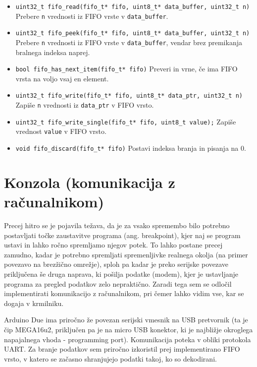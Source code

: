 \documentclass[12pt,a4paper,twoside,openright,slovene]{book}
\begin{document}
\begin{itemize}
	\item[] \lstinline{uint32_t fifo_read(fifo_t* fifo, uint8_t* data_buffer, uint32_t n)}\newline
		Prebere \lstinline{n} vrednosti iz FIFO vrste v \lstinline{data_buffer}.
	\item[] \lstinline{uint32_t fifo_peek(fifo_t* fifo, uint8_t* data_buffer, uint32_t n)}\newline
		Prebere \lstinline{n} vrednosti iz FIFO vrste v \lstinline{data_buffer}, vendar brez premikanja bralnega indeksa naprej.
	\item[] \lstinline{bool fifo_has_next_item(fifo_t* fifo)}\newline
		Preveri in vrne, če ima FIFO vrsta na voljo vsaj en element.
	\item[] \lstinline{uint32_t fifo_write(fifo_t* fifo, uint8_t* data_ptr, uint32_t n)}\newline
		Zapiše \lstinline{n} vrednosti iz \lstinline{data_ptr} v FIFO vrsto.
	\item[] \lstinline{uint32_t fifo_write_single(fifo_t* fifo, uint8_t value);}\newline
		Zapiše vrednost \lstinline{value} v FIFO vrsto.
	\item[] \lstinline{void fifo_discard(fifo_t* fifo)}\newline
		Postavi indeksa branja in pisanja na 0.
\end{itemize}


\section{Konzola (komunikacija z računalnikom)}
Precej hitro se je pojavila težava, da je za vsako spremembo bilo potrebno postavljati točke zaustavitve programa (ang. breakpoint), kjer naj se program ustavi in lahko ročno spremljamo njegov potek. To lahko postane precej zamudno, kadar je potrebno spremljati spremenljivke realnega okolja (na primer povezavo na brezžično omrežje), sploh pa kadar je preko serijske povezave priključena še druga naprava, ki pošilja podatke (modem), kjer je ustavljanje programa za pregled podatkov zelo nepraktično. Zaradi tega sem se odločil implementirati komunikacijo z računalnikom, pri čemer lahko vidim vse, kar se dogaja v krmilniku.

Arduino Due ima priročno že povezan serijski vmesnik na USB pretvornik (ta je čip MEGA16u2, priključen pa je na micro USB konektor, ki je najbližje okroglega napajalnega vhoda - programming port). Komunikacija poteka v obliki protokola UART. Za branje podatkov sem priročno izkoristil prej implementirano FIFO vrsto, v katero se začasno shranjujejo podatki takoj, ko so dekodirani.
\end{document}
